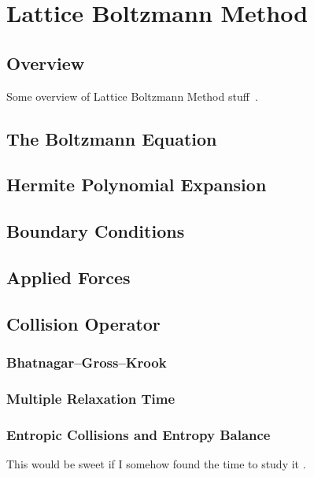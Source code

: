 \documentclass{article}
\begin{document}
\section{Lattice Boltzmann Method}

\subsection{Overview}

Some overview of Lattice Boltzmann Method stuff~\cite{grasinger2015simulation}.

\subsection{The Boltzmann Equation}

\subsection{Hermite Polynomial Expansion}

\subsection{Boundary Conditions}

\subsection{Applied Forces}

\subsection{Collision Operator}

\subsubsection{Bhatnagar--Gross--Krook}

\subsubsection{Multiple Relaxation Time}

\subsubsection{Entropic Collisions and Entropy Balance}

This would be sweet if I somehow found the time to study it \cite{gorban2014enhancement}.
\end{document}
